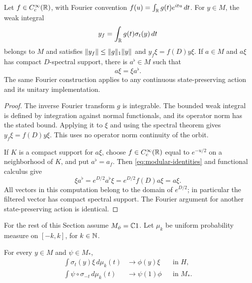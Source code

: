 \begin{lemma}\label{mod:localization}
Let $f\in C_c^\infty(\mathbb R)$, with Fourier convention
$f(u)=\int_{\mathbb R}g(t)e^{itu}\,dt$.
For $y\in M$, the weak integral
\[
  y_f=\int_{\mathbb R}g(t)\sigma_t(y)\,dt
\]
belongs to $M$ and satisfies
$\lVert y_f\rVert\le\lVert g\rVert_1\lVert y\rVert$ and
$y_f\xi=f(D)y\xi$.
If $a\in M$ and $a\xi$ has compact $D$-spectral support, there is $a^\flat\in M$
such that
\begin{equation}\label{eq:right-multiplier}
  a\xi=\xi a^\flat.
\end{equation}
The same Fourier construction applies to any continuous
state-preserving action and its unitary implementation.
\end{lemma}

\begin{proof}
The inverse Fourier transform $g$ is integrable.
The bounded weak integral is defined by integration against normal
functionals, and its operator norm has the stated bound.
Applying it to $\xi$ and using the spectral theorem gives
$y_f\xi=f(D)y\xi$. This uses no operator norm continuity of the orbit.

If $K$ is a compact support for $a\xi$, choose $f\in C_c^\infty(\mathbb R)$
equal to $e^{-u/2}$ on a neighborhood of $K$, and put $a^\flat=a_f$.
Then \eqref{eq:modular-identities} and functional calculus give
\[
  \xi a^\flat=e^{D/2}a^\flat\xi
  =e^{D/2}f(D)a\xi=a\xi.
\]
All vectors in this computation belong to the domain of $e^{D/2}$;
in particular the filtered vector has compact spectral support.
The Fourier argument for another state-preserving action is identical.
\end{proof}

For the rest of this Section assume $M_\phi=\mathbb C1$.
Let $\mu_k$ be uniform probability measure on $[-k,k]$, for
$k\in\mathbb N$.

\begin{lemma}\label{mod:means}
For every $y\in M$ and $\psi\in M_*$,
\begin{align}
  \int\sigma_t(y)\xi\,d\mu_k(t)&\longrightarrow\phi(y)\xi
       &&\text{in }H,\label{eq:hilbert-mean}\\
  \int\psi\circ\sigma_{-t}\,d\mu_k(t)&\longrightarrow\psi(1)\phi
       &&\text{in }M_*.\label{eq:predual-mean}
\end{align}
\end{lemma}


